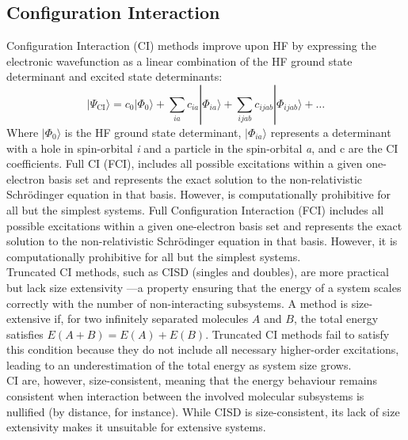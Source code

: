 \subsection{Configuration Interaction}
Configuration Interaction (CI) methods improve upon HF by expressing the electronic wavefunction as a linear combination of the HF ground state determinant and excited state determinants:
\begin{equation} \label{eq:CI}
     |\Psi_{\mathrm{CI}} \rangle = c_0 |\Phi_0 \rangle + \sum_{ia} c_{ia} |\Phi_{ia} \rangle + \sum_{ijab} c_{ijab} |\Phi_{ijab} \rangle + \dots
\end{equation}
Where $|\Phi_0 \rangle$ is the HF ground state determinant, $|\Phi_{ia} \rangle$ represents a determinant with a hole in spin-orbital \textit{i} and a particle in the spin-orbital \textit{a}, and c are the CI coefficients. Full CI (FCI),  includes all possible excitations within a given one-electron basis set and represents the exact solution to the non-relativistic Schrödinger equation in that basis. However, is computationally prohibitive for all but the simplest systems. Full Configuration Interaction (FCI) includes all possible excitations within a given one-electron basis set and represents the exact solution to the non-relativistic Schrödinger equation in that basis. However, it is computationally prohibitive for all but the simplest systems.\\ Truncated CI methods, such as CISD (singles and doubles), are more practical but lack size extensivity ---a property ensuring that the energy of a system scales correctly with the number of non-interacting subsystems. A method is size-extensive if, for two infinitely separated molecules $A$ and $B$, the total energy satisfies $E(A + B) = E(A) + E(B)$. Truncated CI methods fail to satisfy this condition because they do not include all necessary higher-order excitations, leading to an underestimation of the total energy as system size grows.\\
CI are, however, size-consistent, meaning that the energy behaviour remains consistent when interaction between the involved molecular subsystems is nullified (by distance, for instance). While CISD is size-consistent, its lack of size extensivity makes it unsuitable for extensive systems.


